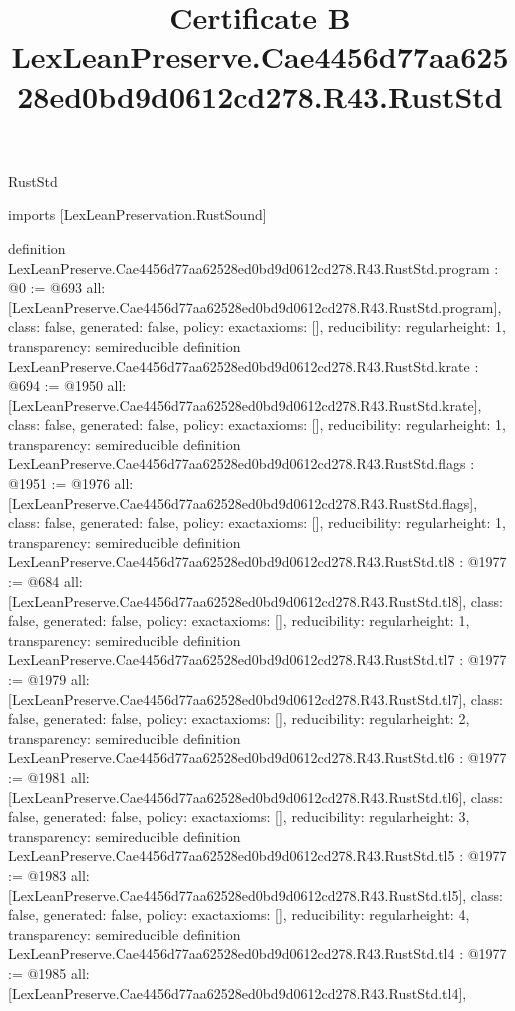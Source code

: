 \begin{lexlean}{RustStd}
\title{Certificate B LexLeanPreserve.Cae4456d77aa62528ed0bd9d0612cd278.R43.RustStd}
\begin{coremodule}
imports [LexLeanPreservation.RustSound]

definition LexLeanPreserve.Cae4456d77aa62528ed0bd9d0612cd278.R43.RustStd.program : @0 := @693 {
  all: [LexLeanPreserve.Cae4456d77aa62528ed0bd9d0612cd278.R43.RustStd.program],
  class: false,
  generated: false,
  policy: exact{axioms: []},
  reducibility: regular{height: 1},
  transparency: semireducible
}
definition LexLeanPreserve.Cae4456d77aa62528ed0bd9d0612cd278.R43.RustStd.krate : @694 := @1950 {
  all: [LexLeanPreserve.Cae4456d77aa62528ed0bd9d0612cd278.R43.RustStd.krate],
  class: false,
  generated: false,
  policy: exact{axioms: []},
  reducibility: regular{height: 1},
  transparency: semireducible
}
definition LexLeanPreserve.Cae4456d77aa62528ed0bd9d0612cd278.R43.RustStd.flags : @1951 := @1976 {
  all: [LexLeanPreserve.Cae4456d77aa62528ed0bd9d0612cd278.R43.RustStd.flags],
  class: false,
  generated: false,
  policy: exact{axioms: []},
  reducibility: regular{height: 1},
  transparency: semireducible
}
definition LexLeanPreserve.Cae4456d77aa62528ed0bd9d0612cd278.R43.RustStd.tl8 : @1977 := @684 {
  all: [LexLeanPreserve.Cae4456d77aa62528ed0bd9d0612cd278.R43.RustStd.tl8],
  class: false,
  generated: false,
  policy: exact{axioms: []},
  reducibility: regular{height: 1},
  transparency: semireducible
}
definition LexLeanPreserve.Cae4456d77aa62528ed0bd9d0612cd278.R43.RustStd.tl7 : @1977 := @1979 {
  all: [LexLeanPreserve.Cae4456d77aa62528ed0bd9d0612cd278.R43.RustStd.tl7],
  class: false,
  generated: false,
  policy: exact{axioms: []},
  reducibility: regular{height: 2},
  transparency: semireducible
}
definition LexLeanPreserve.Cae4456d77aa62528ed0bd9d0612cd278.R43.RustStd.tl6 : @1977 := @1981 {
  all: [LexLeanPreserve.Cae4456d77aa62528ed0bd9d0612cd278.R43.RustStd.tl6],
  class: false,
  generated: false,
  policy: exact{axioms: []},
  reducibility: regular{height: 3},
  transparency: semireducible
}
definition LexLeanPreserve.Cae4456d77aa62528ed0bd9d0612cd278.R43.RustStd.tl5 : @1977 := @1983 {
  all: [LexLeanPreserve.Cae4456d77aa62528ed0bd9d0612cd278.R43.RustStd.tl5],
  class: false,
  generated: false,
  policy: exact{axioms: []},
  reducibility: regular{height: 4},
  transparency: semireducible
}
definition LexLeanPreserve.Cae4456d77aa62528ed0bd9d0612cd278.R43.RustStd.tl4 : @1977 := @1985 {
  all: [LexLeanPreserve.Cae4456d77aa62528ed0bd9d0612cd278.R43.RustStd.tl4],
}
\end{coremodule}
\end{lexlean}
